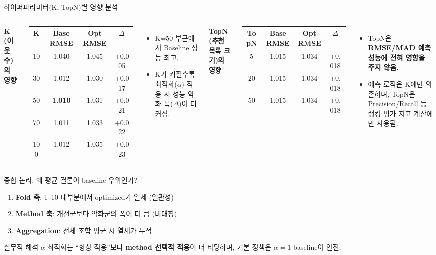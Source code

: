 \documentclass[aspectratio=169,10pt]{beamer}
\begin{document}
\begin{frame}[shrink=5]{하이퍼파라미터(K, TopN)별 영향 분석}
	\begin{columns}[T]
			\textbf{K (이웃 수)의 영향}
			\renewcommand{\arraystretch}{1.2}
			\begin{tabular}{c|c|c|c}
				\toprule
				K & Base RMSE & Opt RMSE & \(\Delta\) \\
				\midrule
				10  & 1.040 & 1.045 & +0.005 \\
				30  & 1.012 & 1.030 & +0.017 \\
				50  & \textbf{1.010} & 1.031 & +0.021 \\
				70  & 1.011 & 1.033 & +0.022 \\
				100 & 1.012 & 1.035 & +0.023 \\
				\bottomrule
			\end{tabular}
			\begin{itemize}
				\item K=50 부근에서 Baseline 성능 최고.
				\item K가 커질수록 최적화(\(\alpha\)) 적용 시 성능 악화 폭(\(\Delta\))이 더 커짐.
			\end{itemize}

			\textbf{TopN (추천 목록 크기)의 영향}
			\renewcommand{\arraystretch}{1.2}
			\begin{tabular}{c|c|c|c}
				\toprule
				TopN & Base RMSE & Opt RMSE & \(\Delta\) \\
				\midrule
				5  & 1.015 & 1.034 & +0.018 \\
				20 & 1.015 & 1.034 & +0.018 \\
				50 & 1.015 & 1.034 & +0.018 \\
				\bottomrule
			\end{tabular}
			\begin{itemize}
				\item TopN은 \textbf{RMSE/MAD 예측 성능에 전혀 영향을 주지 않음}.
				\item 예측 로직은 K에만 의존하며, TopN은 Precision/Recall 등 랭킹 평가 지표 계산에만 사용됨.
			\end{itemize}
	\end{columns}
\end{frame}

\begin{frame}{종합 논리: 왜 평균 결론이 baseline 우위인가?}
	\begin{enumerate}
		\item \textbf{Fold 축}: 1--10 대부분에서 optimized가 열세 (일관성)
		\item \textbf{Method 축}: 개선군보다 악화군의 폭이 더 큼 (비대칭)
		\item \textbf{Aggregation}: 전체 조합 평균 시 열세가 누적
	\end{enumerate}

	\vspace{0.4em}
	\begin{block}{실무적 해석}
		\(\alpha\)-최적화는 ``항상 적용''보다
		\textbf{method 선택적 적용}이 더 타당하며,
		기본 정책은 \(\alpha=1\) baseline이 안전.
	\end{block}
\end{frame}
\end{document}
